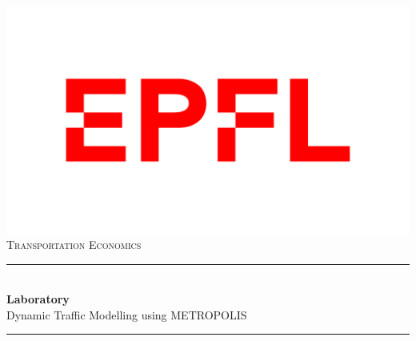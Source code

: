 \documentclass[a4paper, 12pt,oneside]{article}
\begin{document}


\begin{titlepage}

\newcommand{\HRule}{\rule{\linewidth}{0.5mm}} %

\begin{center} %
 


\includegraphics[scale=.1]{Images/logo-epfl.png}\\[0.5cm] %
\textsc{\Large Transportation Economics}\\[1.0cm] %


\HRule \\[0.4cm]
{ \huge  \textbf{Laboratory}}
\\
\bigbreak
{\huge Dynamic Traffic Modelling using METROPOLIS}\\[0.15cm] %
\HRule \\[1.5cm]
\end{center}
\noindent
\begin{minipage}[t]{1\textwidth}
\large


\end{minipage}
\end{titlepage}
\end{document}
